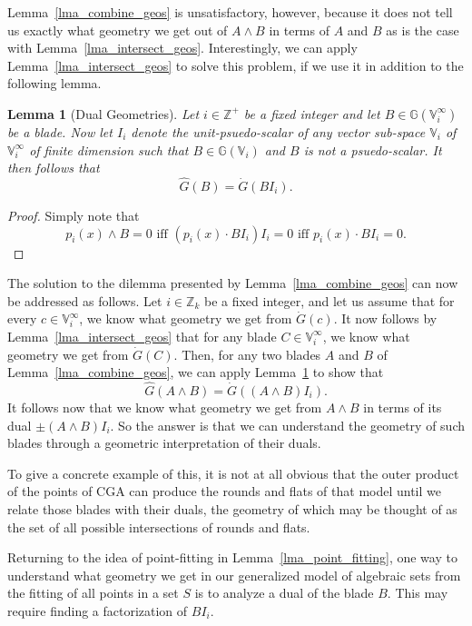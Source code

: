 \documentclass{birkjour}
\newtheorem{lem}[thm]{Lemma}
\theoremstyle{definition}
\theoremstyle{remark}
\numberwithin{equation}{section}
\newcommand{\G}{\mathbb{G}}
\newcommand{\V}{\mathbb{V}}
\newcommand{\Z}{\mathbb{Z}}
\newcommand{\Gi}{\dot{G}}
\newcommand{\Go}{\hat{G}}
\begin{document}
Lemma~\ref{lma_combine_geos} is unsatisfactory, however, because it does not tell
us exactly what geometry we get out of $A\wedge B$ in terms of $A$ and $B$ as is
the case with Lemma~\ref{lma_intersect_geos}.
Interestingly, we can apply Lemma~\ref{lma_intersect_geos} to solve this
problem, if we use it in addition to the following lemma.
\begin{lem}[Dual Geometries]\label{lma_dual_geos}
Let $i\in\Z^+$ be a fixed integer and let $B\in\G(\V_i^\infty)$
be a blade.  Now let $I_i$ denote the unit-psuedo-scalar of
any vector sub-space $\V_i$ of $\V_i^\infty$ of finite dimension
such that $B\in\G(\V_i)$ and $B$ is not a psuedo-scalar.
It then follows that
\begin{equation}
\Go(B)=\Gi(BI_i).
\end{equation}
\end{lem}
\begin{proof}
Simply note that
\begin{equation}
\mbox{$p_i(x)\wedge B=0$ iff $(p_i(x)\cdot BI_i)I_i=0$ iff $p_i(x)\cdot BI_i=0$.}
\end{equation}
\end{proof}
The solution to the dilemma presented by Lemma~\ref{lma_combine_geos}
can now be addressed as follows.  Let $i\in\Z_k$ be a fixed integer,
and let us assume that for every $c\in\V_i^\infty$, we know what
geometry we get from $\Gi(c)$.  It now follows by Lemma~\ref{lma_intersect_geos}
that for any blade $C\in\V_i^\infty$, we know what geometry we get from $\Gi(C)$.
Then, for any two blades $A$ and $B$ of Lemma~\ref{lma_combine_geos},
we can apply Lemma~\ref{lma_dual_geos} to show that
\begin{equation}
\Go(A\wedge B)=\Gi((A\wedge B)I_i).
\end{equation}
It follows now that we know what geometry we get from $A\wedge B$
in terms of its dual $\pm(A\wedge B)I_i$.  So the answer is that we can understand
the geometry of such blades through a geometric interpretation of their duals.

To give a concrete example of this, it is not at all obvious that the
outer product of the points of CGA can produce the rounds and flats of
that model until we relate those blades with their duals, the geometry
of which may be thought of as the set of all possible intersections of rounds and flats.

Returning to the idea of point-fitting in Lemma~\ref{lma_point_fitting}, one way to understand
what geometry we get in our generalized model of algebraic sets
from the fitting of all points in a set $S$ is to analyze a dual of the
blade $B$.  This may require finding a factorization of $BI_i$.
\end{document}
